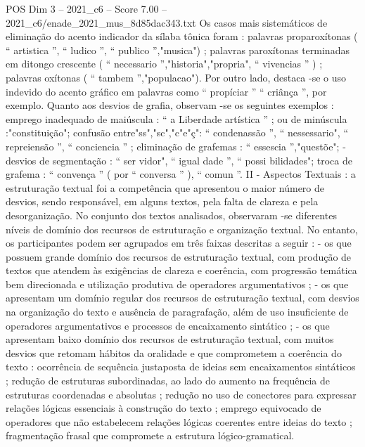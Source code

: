 \begin{textsample}{POS Dim 3 – 2021\_c6 – Score 7.00 – 2021\_c6/enade\_2021\_mus\_8d85dac343.txt}
Os casos mais sistemáticos de eliminação do acento indicador da sílaba tônica foram : palavras proparoxítonas ( “ artistica ”, “ ludico ”, “ publico ”,"musica") ; palavras paroxítonas terminadas em ditongo crescente ( “ necessario ”,"historia","propria", “ vivencias ” ) ; palavras oxítonas ( “ tambem ”,"populacao").
Por outro lado, destaca -se o uso indevido do acento gráfico em palavras como “ propíciar ” “ criânça ”, por exemplo.
Quanto aos desvios de grafia, observam -se os seguintes exemplos : emprego inadequado de maiúscula : “ a Liberdade artística ” ; ou de minúscula :"constituição"; confusão entre"ss","sc","c"e"ç": “ condenassão ”, “ nessessario", “ repreiensão ”, “ conciencia ” ; eliminação de grafemas : “ essescia ”,"questõe"; - desvios de segmentação : “ ser vidor", “ igual dade ”, “ possi bilidades"; troca de grafema : “ convença ” ( por “ conversa ” ), “ comun ”.
II - Aspectos Textuais : a estruturação textual foi a competência que apresentou o maior número de desvios, sendo responsável, em alguns textos, pela falta de clareza e pela desorganização.
No conjunto dos textos analisados, observaram -se diferentes níveis de domínio dos recursos de estruturação e organização textual.
No entanto, os participantes podem ser agrupados em três faixas descritas a seguir : - os que possuem grande domínio dos recursos de estruturação textual, com produção de textos que atendem às exigências de clareza e coerência, com progressão temática bem direcionada e utilização produtiva de operadores argumentativos ; - os que apresentam um domínio regular dos recursos de estruturação textual, com desvios na organização do texto e ausência de paragrafação, além de uso insuficiente de operadores argumentativos e processos de encaixamento sintático ; - os que apresentam baixo domínio dos recursos de estruturação textual, com muitos desvios que retomam hábitos da oralidade e que comprometem a coerência do texto : ocorrência de sequência justaposta de ideias sem encaixamentos sintáticos ; redução de estruturas subordinadas, ao lado do aumento na frequência de estruturas coordenadas e absolutas ; redução no uso de conectores para expressar relações lógicas essenciais à construção do texto ; emprego equivocado de operadores que não estabelecem relações lógicas coerentes entre ideias do texto ; fragmentação frasal que compromete a estrutura lógico-gramatical.

\end{textsample}
